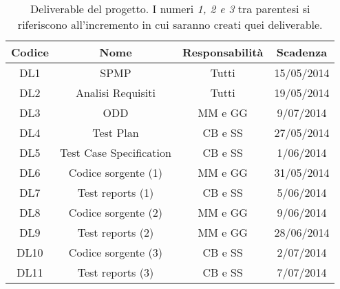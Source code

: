 \begin{table}[b]
	\begin{tabular}{|c|c|c|c|}
	\hline
	\textbf{Codice} & \textbf{Nome} & \textbf{Responsabilità} & \textbf{Scadenza}\\
	\hline
	DL1	& SPMP						& Tutti			& 15/05/2014\\
	\hline
	DL2	& Analisi Requisiti			& Tutti			& 19/05/2014\\
	\hline
	DL3	& ODD						& MM e GG		& 9/07/2014\\
	\hline
	DL4 & Test Plan					& CB e SS		& 27/05/2014\\
	\hline
	DL5 & Test Case Specification	& CB e SS	 	& 1/06/2014\\
	\hline
	DL6 & Codice sorgente (1)		& MM e GG		& 31/05/2014\\
	\hline
	DL7 & Test reports (1)			& CB e SS		& 5/06/2014\\
	\hline
	DL8 & Codice sorgente (2)		& MM e GG		& 9/06/2014\\
	\hline
	DL9 & Test reports (2)			& MM e GG		& 28/06/2014\\
	\hline
	DL10& Codice sorgente (3)		& CB e SS		& 2/07/2014\\
	\hline
	DL11& Test reports (3)			& CB e SS		& 7/07/2014\\
	\hline
	\end{tabular}
	\caption{Deliverable del progetto. I numeri \emph{1, 2 e 3} tra parentesi si riferiscono 
			all'incremento in cui saranno creati quei deliverable.}
	\label{overview:deliverable}
\end{table}